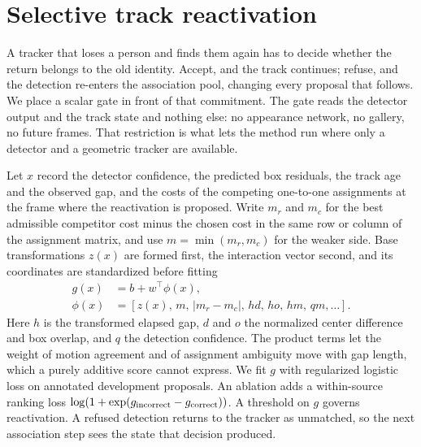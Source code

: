 \section{Selective track reactivation}

A tracker that loses a person and finds them again has to decide whether
the return belongs to the old identity. Accept, and the track continues;
refuse, and the detection re-enters the association pool, changing every
proposal that follows. We place a scalar gate in front of that commitment.
The gate reads the detector output and the track state and nothing else:
no appearance network, no gallery, no future frames. That restriction is
what lets the method run where only a detector and a geometric tracker
are available.

Let $x$ record the detector confidence, the predicted box residuals, the
track age and the observed gap, and the costs of the competing one-to-one
assignments at the frame where the reactivation is proposed. Write $m_r$
and $m_c$ for the best admissible competitor cost minus the chosen cost in
the same row or column of the assignment matrix, and use
$m=\min(m_r,m_c)$ for the weaker side. Base transformations $z(x)$ are
formed first, the interaction vector second, and its coordinates are
standardized before fitting
\begin{align*}
g(x) &= b+w^\top \phi(x),\\
\phi(x) &= [z(x),\,m,\,|m_r-m_c|,\,h d,\,h o,\,h m,\,q m,\ldots].
\end{align*}
Here $h$ is the transformed elapsed gap, $d$ and $o$ the normalized center
difference and box overlap, and $q$ the detection confidence. The product
terms let the weight of motion agreement and of assignment ambiguity move
with gap length, which a purely additive score cannot express.
We fit $g$ with regularized logistic loss on annotated development
proposals. An ablation adds a within-source ranking loss
$\log(1+\exp(g_{\rm incorrect}-g_{\rm correct}))$.
A threshold on $g$ governs reactivation. A refused detection returns to
the tracker as unmatched, so the next association step sees the state that
decision produced.

